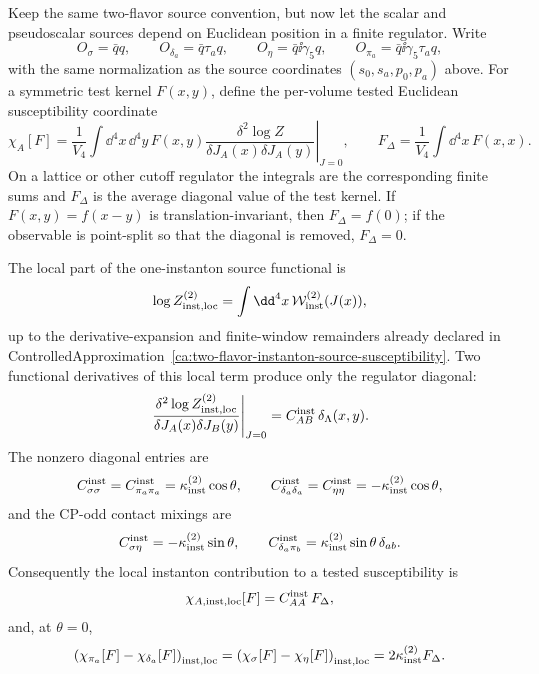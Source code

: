 \begin{controlledapproximation}
\label{ca:instanton-tested-chiral-susceptibility-contact}
Keep the same two-flavor source convention, but now let the scalar and
pseudoscalar sources depend on Euclidean position in a finite regulator.  Write
\[
  O_\sigma=\bar q q,\qquad
  O_{\delta_a}=\bar q\tau_a q,\qquad
  O_\eta=\bar q\ii\gamma_5q,\qquad
  O_{\pi_a}=\bar q\ii\gamma_5\tau_aq ,
\]
with the same normalization as the source coordinates
\((s_0,s_a,p_0,p_a)\) above.  For a symmetric test kernel \(F(x,y)\), define
the per-volume tested Euclidean susceptibility coordinate
\begin{equation}
  \chi_A[F]
  =
  \frac{1}{V_4}
  \left.
  \int\dd^4x\,\dd^4y\,
  F(x,y)
  \frac{\delta^2\log Z}{\delta J_A(x)\delta J_A(y)}
  \right|_{J=0},
  \qquad
  F_\Delta=
  \frac{1}{V_4}\int\dd^4x\,F(x,x).
  \label{eq:instanton-tested-susceptibility-definition}
\end{equation}
On a lattice or other cutoff regulator the integrals are the corresponding
finite sums and \(F_\Delta\) is the average diagonal value of the test kernel.
If \(F(x,y)=f(x-y)\) is translation-invariant, then \(F_\Delta=f(0)\); if the
observable is point-split so that the diagonal is removed, \(F_\Delta=0\).

The local part of the one-instanton source functional is
\[
  \log Z_{\rm inst,loc}^{(2)}
  =
  \int\dd^4x\,
  \mathcal W_{\rm inst}^{(2)}(J(x)) ,
\]
up to the derivative-expansion and finite-window remainders already declared
in ControlledApproximation~\ref{ca:two-flavor-instanton-source-susceptibility}.
Two functional derivatives of this local term produce only the regulator
diagonal:
\[
  \left.
  \frac{\delta^2\log Z_{\rm inst,loc}^{(2)}}
       {\delta J_A(x)\delta J_B(y)}
  \right|_{J=0}
  =
  C_{AB}^{\rm inst}\,\delta_\Lambda(x,y).
\]
The nonzero diagonal entries are
\[
  C_{\sigma\sigma}^{\rm inst}
  =
  C_{\pi_a\pi_a}^{\rm inst}
  =
  \kappa_{\rm inst}^{(2)}\cos\theta,
  \qquad
  C_{\delta_a\delta_a}^{\rm inst}
  =
  C_{\eta\eta}^{\rm inst}
  =
  -\kappa_{\rm inst}^{(2)}\cos\theta,
\]
and the CP-odd contact mixings are
\[
  C_{\sigma\eta}^{\rm inst}
  =
  -\kappa_{\rm inst}^{(2)}\sin\theta,
  \qquad
  C_{\delta_a\pi_b}^{\rm inst}
  =
  \kappa_{\rm inst}^{(2)}\sin\theta\,\delta_{ab}.
\]
Consequently the local instanton contribution to a tested susceptibility is
\begin{equation}
  \chi_{A,{\rm inst,loc}}[F]
  =
  C_{AA}^{\rm inst}\,F_\Delta ,
  \label{eq:instanton-tested-susceptibility-local-contact}
\end{equation}
and, at \(\theta=0\),
\begin{equation}
  \left(\chi_{\pi_a}[F]-\chi_{\delta_a}[F]\right)_{\rm inst,loc}
  =
  \left(\chi_{\sigma}[F]-\chi_{\eta}[F]\right)_{\rm inst,loc}
  =
  2\kappa_{\rm inst}^{(2)}F_\Delta .
  \label{eq:instanton-tested-u1a-contact-splitting}
\end{equation}


\end{controlledapproximation}
